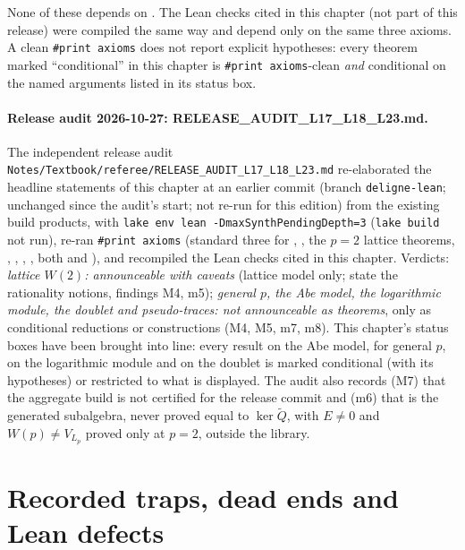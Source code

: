 None of these depends on . The Lean checks cited in this chapter (not part of this release) were
compiled the same way and depend only on the same three axioms.
A clean \texttt{\#print axioms} does not report explicit hypotheses: every theorem marked ``conditional'' in this chapter
is \texttt{\#print axioms}-clean \emph{and} conditional on the named  arguments listed in its status box.

\paragraph{Release audit 2026-10-27: RELEASE\_AUDIT\_L17\_L18\_L23.md.} The independent release audit
\texttt{Notes/\allowbreak Textbook/\allowbreak referee/\allowbreak RELEASE\_AUDIT\_L17\_L18\_L23.md} re-elaborated the headline
statements of this chapter at an earlier commit (branch \texttt{deligne-lean};  unchanged since
the audit's start; not re-run for this edition) from the existing build products, with \texttt{lake env lean -DmaxSynthPendingDepth=3} (\texttt{lake build} not
run), re-ran \texttt{\#print axioms} (standard three for , , the $p=2$ lattice theorems,
, , ,
, both  and ), and recompiled
the Lean checks cited in this chapter. Verdicts:
\emph{lattice $W(2)$: announceable with caveats} (lattice model only; state the rationality notions, findings M4, m5);
\emph{general $p$, the Abe model, the logarithmic module, the doublet and pseudo-traces: not announceable as theorems}, only as
conditional reductions or constructions (M4, M5, m7, m8). This chapter's status boxes have been brought into line: every result
on the Abe model, for general $p$, on the logarithmic module and on the doublet is marked conditional (with its hypotheses) or
restricted to what is displayed. The audit also records (M7) that the aggregate build is not certified for the release commit and
(m6) that  is the generated subalgebra, never proved equal to $\ker\widetilde Q$, with $E\ne0$ and
$W(p)\ne V_{L_p}$ proved only at $p=2$, outside the library.

\section{Recorded traps, dead ends and Lean defects}\label{l18:sec:traps}


